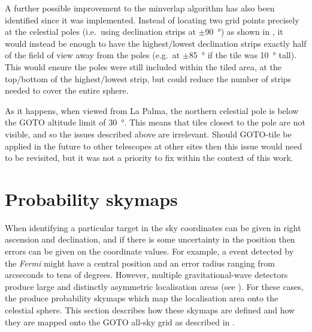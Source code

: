 \begin{colsection}
A further possible improvement to the minverlap algorithm has also been identified since it was implemented. Instead of locating two grid points precisely at the celestial poles (i.e.\ using declination strips at $\pm$\SI{90}{\degree}) as shown in , it would instead be enough to have the highest/lowest declination strips exactly half of the field of view away from the poles (e.g.\ at $\pm$\SI{85}{\degree} if the tile was \SI{10}{\degree} tall). This would ensure the poles were still included within the tiled area, at the top/bottom of the highest/lowest strip, but could reduce the number of strips needed to cover the entire sphere.

As it happens, when viewed from La Palma, the northern celestial pole is below the GOTO altitude limit of \SI{30}{\degree}. This means that tiles closest to the pole are not visible, and so the issues described above are irrelevant. Should GOTO-tile be applied in the future to other telescopes at other sites then this issue would need to be revisited, but it was not a priority to fix within the context of this work.

\end{colsection}


\section{Probability skymaps}
\label{sec:skymaps}


\begin{colsection}

When identifying a particular target in the sky coordinates can be given in right ascension and declination, and if there is some uncertainty in the position then errors can be given on the coordinate values. For example, a  event detected by the \textit{Fermi}  might have a central position and an error radius ranging from arcseconds to tens of degrees. However, multiple gravitational-wave detectors produce large and distinctly asymmetric localisation areas (see ). For these cases, the  produce probability skymaps which map the localisation area onto the celestial sphere. This section describes how these skymaps are defined and how they are mapped onto the GOTO all-sky grid as described in .

\end{colsection}

